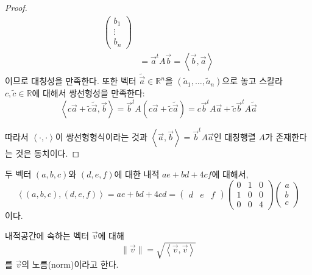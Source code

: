 \documentclass[../engineering_mathematics_lecture_note.tex]{subfiles}
\begin{document}
\begin{proof}
\begin{align*}
\begin{pmatrix}
                                        b_1\\
                                        \vdots\\
                                        b_n
                                    \end{pmatrix}\\
                                    &= \vec a^t A \vec b = \left<\vec b, \vec a\right>
    \end{align*}
    이므로 대칭성을 만족한다.
    또한 벡터 $\tilde{\vec a} \in \mathbb R^n$을 $(\tilde a_1, \dots, \tilde a_n)$으로 놓고 스칼라 $c, \tilde c \in \mathbb R$에 대해서 쌍선형성을 만족한다:
    \begin{equation*}
        \left<c \vec a + \tilde c \tilde{\vec a}, \vec b\right> = \vec b^t A (c \vec a + \tilde c \tilde{\vec a}) = c \vec b^t A \vec a + \tilde c \vec b^t A \tilde{\vec a}
    \end{equation*}

    따라서 $\left<\cdot, \cdot\right>$이 쌍선형형식이라는 것과 $\left<\vec a, \vec b\right> = \vec b^t A \vec a$인 대칭행렬 $A$가 존재한다는 것은 동치이다.
\end{proof}

\begin{example}
    두 벡터 $(a, b, c)$와 $(d, e, f)$에 대한 내적 $ae + bd + 4cf$에 대해서,
    \begin{equation*}
        \left<(a, b, c), (d, e, f)\right> = ae + bd + 4cd =
        \begin{pmatrix}
            d & e & f
        \end{pmatrix}
        \begin{pmatrix}
            0 & 1 & 0\\
            1 & 0 & 0\\
            0 & 0 & 4
        \end{pmatrix}
        \begin{pmatrix}
            a \\ b \\ c
        \end{pmatrix}
    \end{equation*}
    이다.
\end{example}

\begin{definition}
    내적공간에 속하는 벡터 $\vec v$에 대해
    \begin{equation*}
        \lVert \vec v \rVert = \sqrt{\left<\vec v, \vec v\right>}
    \end{equation*}
    를 $\vec v$의 노름(norm)이라고 한다.
\end{definition}
\end{document}
